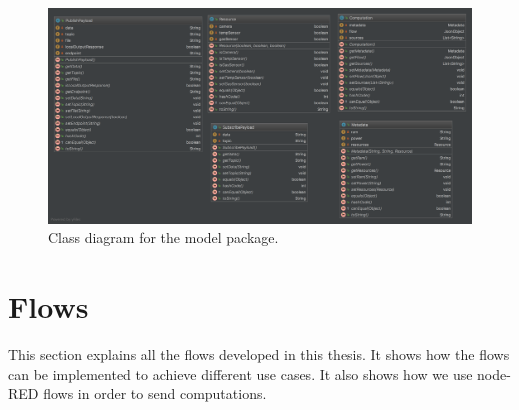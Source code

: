 \begin{itemize}
 \begin{figure}[H]
	\centering
	\includegraphics[scale=0.13]{images/cd-models.png}
	\caption{Class diagram for the model package. }
	\label{fig:cd-models}
\end{figure}

\end{itemize}


\section{Flows}
This section explains all the flows developed in this thesis. It shows how the flows can be implemented to achieve different use cases. It also shows how we use node-RED flows in order to send computations.
